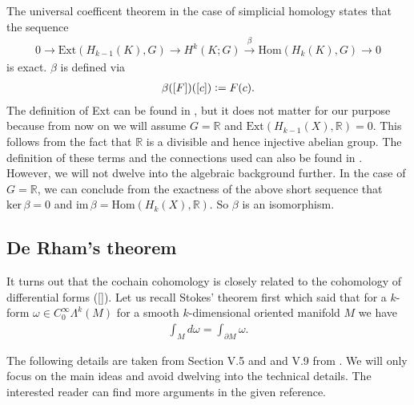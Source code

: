 \documentclass[12pt,a4paper]{article}
\numberwithin{equation}{subsection}
\numberwithin{lemma}{subsection}
\theoremstyle{definition}
\newcommand{\smoothcompforms}[2]{C_0^\infty \Lambda^{#1}(#2)}
\newcommand{\real}{\mathbb{R}}
\begin{document}
The universal coefficent theorem in the case of simplicial homology states
that the sequence 
\begin{align}
    0 \rightarrow \text{Ext}(H_{k-1}(K),G) \rightarrow 
    H^k(K;G) \xrightarrow{\beta} \text{Hom}(H_k(K),G) 
    \rightarrow 0 \label{eq:univeral_coefficient_theorem}
\end{align}
is exact. 
$\beta$ is defined via 
\begin{align}
    \beta([F])([c]) \vcentcolon= F(c).
    \label{eq:isomorphism_from_universal_coefficent_theorem}
\end{align}
The definition of Ext can be found in \cite{topology_and_geometry},
but it does not matter for our purpose because from now on we will assume
$G = \real$ and
$\text{Ext}(H_{k-1}(X),\real) = 0$. This follows from the fact that 
$\real$ is a divisible and hence injective abelian group. The definition of
these terms and the connections used can also be found in 
\cite[Sec.\,V.6]{topology_and_geometry}. However, we will not dwelve into the 
algebraic background further. In the case of $G = \real$, 
we can conclude from the exactness of the 
above short sequence that $\text{ker}\,\beta = 0$ and 
$\text{im}\,\beta = \text{Hom}(H_k(X),\real)$. So $\beta$ is an isomorphism.


\subsection{De Rham's theorem} \label{sec:de_rhams_theorem}

It turns out that the cochain cohomology is closely related to the cohomology 
of differential forms (\ref{}). Let us recall Stokes' theorem first which said 
that for a $k$-form $\omega \in \smoothcompforms{k}{M}$ 
for a smooth $k$-dimensional oriented manifold $M$ we have 
\begin{align*}
    \int_M d\omega = \int_{\partial M} \omega.
\end{align*}

The following details are taken from Section V.5 and and V.9 from 
\cite{topology_and_geometry}. We will only focus on the main ideas and avoid 
dwelving into the technical details. The interested reader can find more 
arguments in the given reference.
\end{document}
